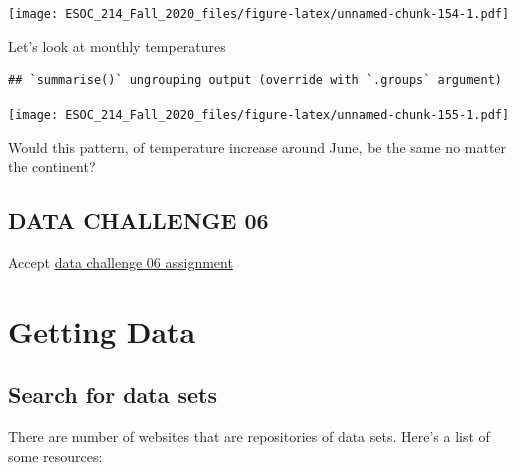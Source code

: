 \documentclass[
]{book}
\newenvironment{Shaded}{\begin{snugshade}}{\end{snugshade}}
\newcommand{\DataTypeTok}[1]{\textcolor[rgb]{0.13,0.29,0.53}{#1}}
\newcommand{\KeywordTok}[1]{\textcolor[rgb]{0.13,0.29,0.53}{\textbf{#1}}}
\newcommand{\NormalTok}[1]{#1}
\newcommand{\OperatorTok}[1]{\textcolor[rgb]{0.81,0.36,0.00}{\textbf{#1}}}
\newcommand{\OtherTok}[1]{\textcolor[rgb]{0.56,0.35,0.01}{#1}}
\newcommand{\StringTok}[1]{\textcolor[rgb]{0.31,0.60,0.02}{#1}}
\begin{document}
\texttt{[image: ESOC\_214\_Fall\_2020\_files/figure-latex/unnamed-chunk-154-1.pdf]}

Let's look at monthly temperatures

\begin{Shaded}
\end{Shaded}

\begin{verbatim}
## `summarise()` ungrouping output (override with `.groups` argument)
\end{verbatim}

\texttt{[image: ESOC\_214\_Fall\_2020\_files/figure-latex/unnamed-chunk-155-1.pdf]}

Would this pattern, of temperature increase around June, be the same no matter the continent?

\hypertarget{data-challenge-06}{%
\section{DATA CHALLENGE 06}\label{data-challenge-06}}

Accept \href{https://classroom.github.com/a/6RuMwg7C}{data challenge 06 assignment}

\hypertarget{getting-data}{%
\chapter{Getting Data}\label{getting-data}}

\hypertarget{search-for-data-sets}{%
\section{Search for data sets}\label{search-for-data-sets}}

There are number of websites that are repositories of data sets. Here's a list of some resources:
\end{document}
